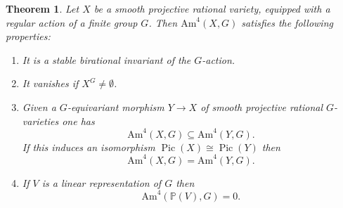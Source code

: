 \documentclass[12pt,reqno]{amsart}
\theoremstyle{plain}
\newtheorem{theo}[prop]{Theorem}
\theoremstyle{remark}
\theoremstyle{definition}
\numberwithin{equation}{section}
\newcommand{\bP}{{\mathbb P}}
\newcommand{\Am}{\mathrm{Am}}
\DeclareMathOperator{\Pic}{Pic}
\begin{document}
\begin{theo}
\label{thm:amit4}
Let $X$ be a smooth projective rational variety, equipped with a regular action of a finite group $G$. Then 
$\Am^4(X,G)$ satisfies the following properties:
\begin{enumerate}
\item It is a stable birational invariant of the $G$-action.
\item It vanishes if $X^G\neq \emptyset$. 
\item Given a $G$-equivariant morphism $Y\to X$ of smooth projective rational
$G$-varieties one has
$$
\Am^4(X,G)\subseteq \Am^4(Y,G). 
$$
If this induces an isomorphism $\Pic(X)\cong\Pic(Y)$ then  
$$
\Am^4(X,G)=\Am^4(Y,G).
$$
\item If $V$ is a linear representation of $G$ then 
$$
\Am^4(\bP(V),G)=0. 
$$
\end{enumerate}
\end{theo}
\end{document}
